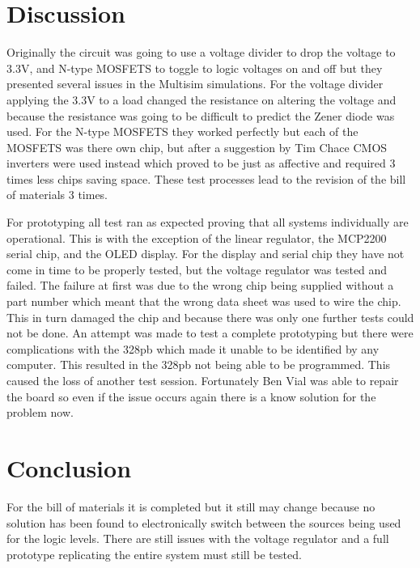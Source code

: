 \documentclass[12pt]{article}
\begin{document}
    \section{Discussion}
    Originally the circuit was going to use a voltage divider to drop the voltage to 3.3V, and N-type MOSFETS to toggle to logic voltages on and off but they presented several issues in the Multisim simulations. For the voltage divider applying the 3.3V to a load changed the resistance on altering the voltage and because the resistance was going to be difficult to predict the Zener diode was used. For the N-type MOSFETS they worked perfectly but each of the MOSFETS was there own chip, but after a suggestion by Tim Chace CMOS inverters were used instead which proved to be just as affective and required 3 times less chips saving space. These test processes lead to the revision of the bill of materials 3 times.
    \par For prototyping all test ran as expected proving that all systems individually are operational. This is with the exception of the linear regulator, the MCP2200 serial chip, and the OLED display.
    For the display and serial chip they have not come in time to be properly tested, but the voltage regulator was tested and failed. The failure at first was due to the wrong chip being supplied without a part number which meant that the wrong data sheet was used to wire the chip. This in turn damaged the chip and because there was only one further tests could not be done. An attempt was made to test a complete prototyping but there were complications with the 328pb which made it unable to be identified by any computer. This resulted in the 328pb not being able to be programmed. This caused the loss of another test session. Fortunately Ben Vial was able to repair the board so even if the issue occurs again there is a know solution for the problem now.

    \section{Conclusion}
    For the bill of materials it is completed but it still may change because no solution has been found to electronically switch between the sources being used for the logic levels. There are still issues with the voltage regulator and a full prototype replicating the entire system must still be tested.
\end{document}
